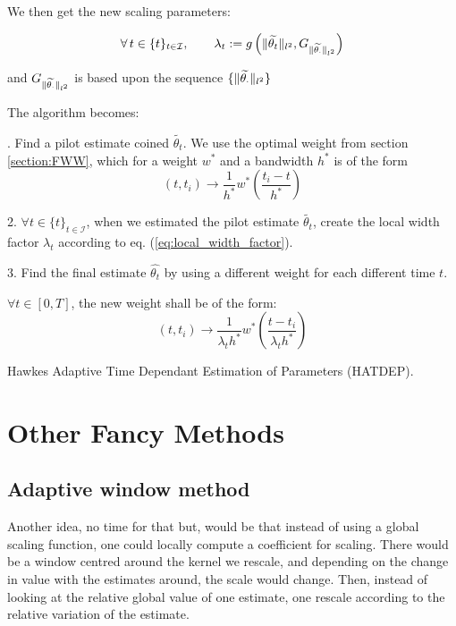 \documentclass[11pt]{book}
\newcommand{\sequencetime}{\{t\}_{t \in \mathcal I} }
\begin{document}
We then get the new scaling parameters:


\begin{equation}
\forall t \in \sequencetime, \qquad \lambda_{t} :=  
g \left (\norm{\widetilde{\theta_{t}}}_{l^2}, 
G_{\norm{\widetilde{\theta_{\cdot}}}_{l^2}} \right)   
\end{equation}

and  $ G_{\lVert \widetilde{\theta_{\cdot}}\rVert_{l^2}} $ is based upon the sequence $\{ \lVert \widetilde{\theta_{\cdot}}\rVert_{l^2} \} $


The algorithm becomes:


\begin{algorithm}[H]
\label{algo:adaptive2}
. \quad Find a pilot estimate coined $\widetilde{\theta_t}$. We use the optimal weight from section \ref{section:FWW}, which for a weight $w^*$ and a bandwidth $h^*$ is of the form  $$ (t, t_i) \to \frac 1 {h^*} w^* \left ( \frac{t_i - t }{h^*} \right ) $$ 

2. \quad $\forall t \in \sequencetime$, when we estimated the pilot estimate $\widetilde{\theta_t}$, create the local width factor $\lambda_t$ according to eq. (\ref{eq:local_width_factor}). 

3. \quad Find the final estimate $\hat{\theta_t}$ by using a different weight for each different time $t$. 

$\forall t \in [0,T]$, the new weight shall be of the form:
$$ (t, t_i) \to \frac 1 {\lambda_{t} h^*} w^* \left ( \frac{t - t_i}{\lambda_{t} h^*} \right )$$ 
\caption{Hawkes Adaptive Time Dependant Estimation of Parameters (HATDEP).}
\end{algorithm}


\section{Other Fancy Methods}

\subsection{Adaptive window method}
Another idea, no time for that but, would be that instead of using a global scaling function, one could locally compute a coefficient for scaling. There would be a window centred around the kernel we rescale, and depending on the change in value with the estimates around, the scale would change. Then, instead of looking at the relative global value of one estimate, one rescale according to the relative variation of the estimate.
\end{document}
